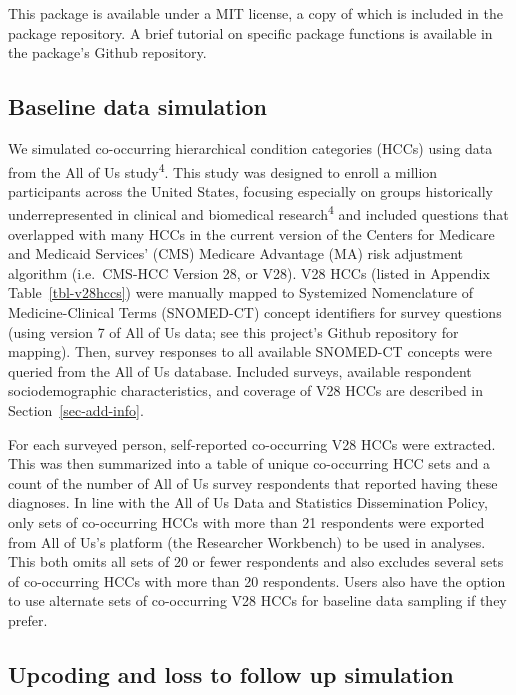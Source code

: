 \documentclass[
  12pt,
  number,
  doubleblind]{elsarticle}
\begin{document}
This package is available under a MIT license, a copy of which is
included in the package repository. A brief tutorial on specific package
functions is available in the package's Github repository.

\subsection{Baseline data
simulation}\label{sec-baseline-data-simulation}

We simulated co-occurring hierarchical condition categories (HCCs) using
data from the All of Us study\textsuperscript{4}. This study was
designed to enroll a million participants across the United States,
focusing especially on groups historically underrepresented in clinical
and biomedical research\textsuperscript{4} and included questions that
overlapped with many HCCs in the current version of the Centers for
Medicare and Medicaid Services' (CMS) Medicare Advantage (MA) risk
adjustment algorithm (i.e.~CMS-HCC Version 28, or V28). V28 HCCs (listed
in Appendix Table~\ref{tbl-v28hccs}) were manually mapped to Systemized
Nomenclature of Medicine-Clinical Terms (SNOMED-CT) concept identifiers
for survey questions (using version 7 of All of Us data; see this
project's Github repository for mapping). Then, survey responses to all
available SNOMED-CT concepts were queried from the All of Us database.
Included surveys, available respondent sociodemographic characteristics,
and coverage of V28 HCCs are described in Section~\ref{sec-add-info}.

For each surveyed person, self-reported co-occurring V28 HCCs were
extracted. This was then summarized into a table of unique co-occurring
HCC sets and a count of the number of All of Us survey respondents that
reported having these diagnoses. In line with the All of Us Data and
Statistics Dissemination Policy, only sets of co-occurring HCCs with
more than 21 respondents were exported from All of Us's platform (the
Researcher Workbench) to be used in analyses. This both omits all sets
of 20 or fewer respondents and also excludes several sets of
co-occurring HCCs with more than 20 respondents. Users also have the
option to use alternate sets of co-occurring V28 HCCs for baseline data
sampling if they prefer.

\subsection{Upcoding and loss to follow up
simulation}\label{upcoding-and-loss-to-follow-up-simulation}
\end{document}
